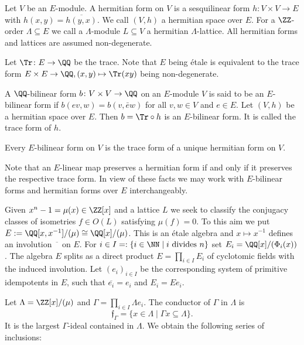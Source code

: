 \begin{definition}
Let $V$ be an $E$-module. A hermitian form on $V$ is a sesquilinear form $h \colon V \times V \to E$ with $h(x,y) = \overline{h(y,x)}$. We call $(V,h)$ a hermitian space over $E$.
For a $\ZZ$-order $\Lambda \subseteq E$ we call a $\Lambda$-module $L \subseteq V$ a hermitian $\Lambda$-lattice. All hermitian forms and lattices are assumed non-degenerate.
\end{definition}
Let  $\Tr \colon E \to \QQ$ be the trace.
Note that $E$ being \'etale is equivalent to the trace form $E\times E \to \QQ, (x,y) \mapsto \Tr(xy)$ being non-degenerate.

\begin{definition}[Transfer]
A $\QQ$-bilinear form $b \colon V \times V \to \QQ$ on an $E$-module $V$ is said to be an $E$-bilinear form if $b(ev,w) = b(v,\bar e w)$ for all $v,w \in V$ and $e \in E$.
Let $(V,h)$ be a hermitian space over $E$. Then $b = \Tr \circ h$ is an $E$-bilinear form. It is called the trace form of $h$.
\end{definition}

\begin{proposition}
Every $E$-bilinear form on $V$ is the trace form of a unique hermitian form on $V$.
\end{proposition}

Note that an $E$-linear map preserves a hermitian form if and only if it preserves the respective trace form. In view of these facts we may work with $E$-bilinear forms and hermitian forms over $E$ interchangeably.

Given $x^n-1=\mu(x)\in \ZZ[x]$ and a lattice $L$ we seek to classify the conjugacy classes of isometries $f\in O(L)$ satisfying $\mu(f) = 0$.
To this aim we put
$E:=\QQ[x,x^{-1}]/(\mu)\cong \QQ[x]/(\mu)$. This is an \'etale algebra and
$x \mapsto  x^{-1}$ defines an involution
$\overline{\phantom{x}} $ on $E$.
For $i \in I =: \{i \in \NN \mid i \text{ divides } n\}$ set $E_i=\QQ[x]/(\Phi_i(x))$.
The algebra $E$ splits as a direct product $E= \prod_{i \in I} E_i$
of cyclotomic fields with the induced involution.
Let $(e_i)_{i \in I}$ be the corresponding system of primitive idempotents in $E$, such that $\overline{e_i} = e_i$ and $E_i = E e_i$.

Let $\Lambda = \ZZ[x]/(\mu)$ and $\Gamma = \prod_{i \in I} \Lambda e_i$.
The conductor of $\Gamma$ in $\Lambda$ is
\[\mathfrak{f}_\Gamma= \{x \in \Lambda \mid \Gamma x \subseteq \Lambda\}.\]
It is the largest $\Gamma$-ideal contained in $\Lambda$.
We obtain the following series of inclusions:

